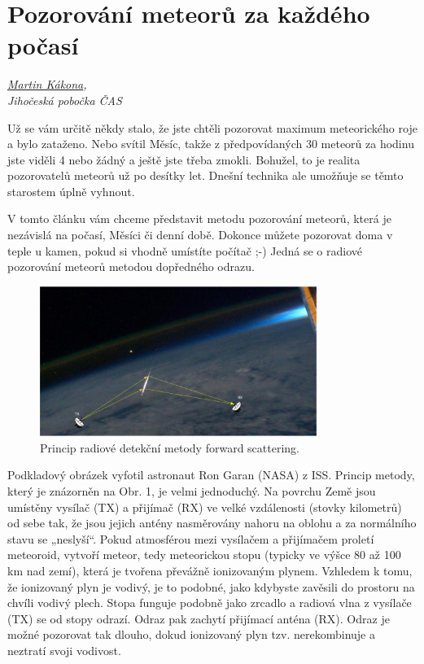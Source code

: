 \documentclass[10pt,a5paper,twoside]{book}
\newcommand{\autor}[1]{
	\begin{flushright}
	\textit{#1}
	\end{flushright}
}
\begin{document}
\section*{Pozorování meteorů za každého počasí}
\autor{\href{mailto:martin.kakona@astro.cz}{Martin Kákona},\\Jihočeská pobočka ČAS}

Už se vám určitě někdy stalo, že jste chtěli pozorovat maximum meteorického roje a bylo zataženo. Nebo svítil Měsíc, takže z předpovídaných 30 meteorů za hodinu jste viděli 4 nebo žádný a ještě jste třeba zmokli. Bohužel, to je realita pozorovatelů meteorů už po desítky let. Dnešní technika ale umožňuje se těmto starostem úplně vyhnout.

V tomto článku vám chceme představit metodu pozorování meteorů, která je nezávislá na počasí, Měsíci či denní době. Dokonce můžete pozorovat doma v teple u kamen, pokud si vhodně umístíte počítač ;-) Jedná se o radiové pozorování meteorů metodou dopředného odrazu.
\begin{figure}[htbp]
	\begin{center}
		\includegraphics[width=9cm]{graves/graves_soubory/image001.eps}
	  	\caption{Princip radiové detekční metody forward scattering.}
	  	\label{fig:}
	\end{center}
\end{figure}
Podkladový obrázek vyfotil astronaut Ron Garan (NASA) z ISS.
Princip metody, který je znázorněn na Obr. 1, je velmi jednoduchý. Na povrchu Země jsou umístěny vysílač (TX) a přijímač (RX) ve velké vzdálenosti (stovky kilometrů) od sebe tak, že jsou jejich antény nasměrovány nahoru na oblohu a za normálního stavu se „neslyší“. Pokud atmosférou mezi vysílačem a přijímačem proletí meteoroid, vytvoří meteor, tedy meteorickou stopu (typicky ve výšce 80 až 100 km nad zemí), která je tvořena převážně ionizovaným plynem. Vzhledem k tomu, že ionizovaný plyn je vodivý, je to podobné, jako kdybyste zavěsili do prostoru na chvíli vodivý plech. Stopa funguje podobně jako zrcadlo a radiová vlna z vysílače (TX) se od stopy odrazí. Odraz pak zachytí přijímací anténa (RX). Odraz je možné pozorovat tak dlouho, dokud ionizovaný plyn tzv. nerekombinuje a neztratí svoji vodivost.
\end{document}
